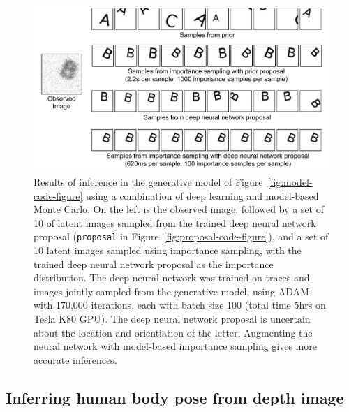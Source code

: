 \begin{figure}[h]
\centering
    \includegraphics[width=1.0\textwidth]{images/deep-neural-network-is.pdf}
    \caption{
Results of inference in the generative model of Figure~\ref{fig:model-code-figure} using a combination of deep learning and model-based Monte Carlo.
On the left is the observed image, followed by a set of 10 of latent images sampled from the trained deep neural network proposal (\texttt{proposal} in Figure~\ref{fig:proposal-code-figure}), and a set of 10 latent images sampled using importance sampling, with the trained deep neural network proposal as the importance distribution.
The deep neural network was trained on traces and images jointly sampled from the generative model, using ADAM with 170,000 iterations, each with batch size 100 (total time 5hrs on Tesla K80 GPU).
The deep neural network proposal is uncertain about the location and orientiation of the letter.
Augmenting the neural network with model-based importance sampling gives more accurate inferences.
}
    \label{fig:example-results}
\end{figure}






\subsection{Inferring human body pose from depth image}
